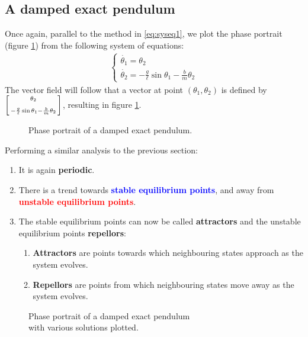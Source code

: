 \documentclass[12pt, a4paper, titlepage]{article}
\theoremstyle{definition}
\numberwithin{equation}{section}
\theoremstyle{definition}
\theoremstyle{definition}
\begin{document}
\subsection{A damped exact pendulum}
Once again, parallel to the method in \eqref{eq:syseq1}, we plot the phase portrait (figure \ref{fig:phase_exact_damped_noplot}) from the following system of equations:
\begin{align}
\begin{cases}
\dot{\theta_1}=\theta_2\\
\dot{\theta_2}=-\frac{g}{\ell}\sin\theta_1-\frac{b}{m}\theta_2
\end{cases}
\end{align}
The vector field will follow that a vector at point $(\theta_1, \theta_2)$ is defined by $\begin{bsmallmatrix}\theta_2\\[6pt]-\frac{g}{\ell}\sin\theta_1-\frac{b}{m}\theta_2\end{bsmallmatrix}$, resulting in figure \ref{fig:phase_exact_damped_noplot}.
\begin{figure}[H]
    \centering
    
    \caption{Phase portrait of a damped exact pendulum.}
    \label{fig:phase_exact_damped_noplot}
\end{figure}
Performing a similar analysis to the previous section:
\begin{enumerate}
\item It is again \textbf{periodic}.
\item There is a trend towards \textcolor{blue}{\textbf{stable equilibrium points}}, and away from \textcolor{red}{\textbf{unstable equilibrium points}}.
\item The stable equilibrium points can now be called \textbf{attractors} and the unstable equilibrium points \textbf{repellors}: \parencite{wolfram}
\begin{enumerate}
\item \textbf{Attractors} are points towards which neighbouring states approach as the system evolves.
\item \textbf{Repellors} are points from which neighbouring states move away as the system evolves.
\end{enumerate}
\end{enumerate}
\begin{figure}[H]
    \centering
    
    \caption{Phase portrait of a damped exact pendulum\\with various solutions plotted.}
    \label{fig:phase_exact_damped_plot}
\end{figure}
\end{document}
